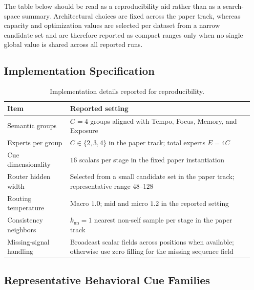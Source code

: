\documentclass[sigconf,review,anonymous]{acmart}
\begin{document}
The table below should be read as a reproducibility aid rather than as a search-space summary. Architectural choices are fixed across the paper track, whereas capacity and optimization values are selected per dataset from a narrow candidate set and are therefore reported as compact ranges only when no single global value is shared across all reported runs.

\subsection{Implementation Specification}

\begin{table}[t]
  \centering
  \caption{Implementation details reported for reproducibility.}
  \label{tab:appendix-implementation-spec}
  \footnotesize
  \setlength{\tabcolsep}{4pt}
  \begin{tabularx}{\columnwidth}{@{}>{\raggedright\arraybackslash}X>{\raggedright\arraybackslash}X@{}}
    \toprule
    Item & Reported setting \\
    \midrule
    Semantic groups & $G=4$ groups aligned with Tempo, Focus, Memory, and Exposure \\
    Experts per group & $C\in\{2,3,4\}$ in the paper track; total experts $E=4C$ \\
    Cue dimensionality & $16$ scalars per stage in the fixed paper instantiation \\
    Router hidden width & Selected from a small candidate set in the paper track; representative range $48$--$128$ \\
    Routing temperature & Macro $1.0$; mid and micro $1.2$ in the reported setting \\
    Consistency neighbors & $k_{\mathrm{nn}}=1$ nearest non-self sample per stage in the paper track \\
    Missing-signal handling & Broadcast scalar fields across positions when available; otherwise use zero filling for the missing sequence field \\
    \bottomrule
  \end{tabularx}
\end{table}

\subsection{Representative Behavioral Cue Families}
\end{document}
